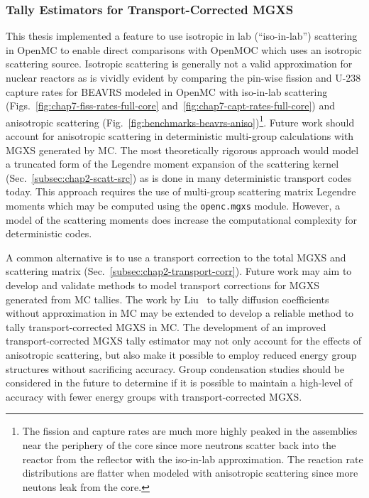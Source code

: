 \subsubsection{Tally Estimators for Transport-Corrected MGXS}
\label{subsubsec:chap12-transport-mgxs}

This thesis implemented a feature to use isotropic in lab (``iso-in-lab'') scattering in OpenMC to enable direct comparisons with OpenMOC which uses an isotropic scattering source. Isotropic scattering is generally not a valid approximation for nuclear reactors as is vividly evident by comparing the pin-wise fission and U-238 capture rates for \ac{BEAVRS} modeled in OpenMC with iso-in-lab scattering (Figs.~\ref{fig:chap7-fiss-rates-full-core} and~\ref{fig:chap7-capt-rates-full-core}) and anisotropic scattering (Fig.~\ref{fig:benchmarks-beavrs-aniso})\footnote{The fission and capture rates are much more highly peaked in the assemblies near the periphery of the core since more neutrons scatter back into the reactor from the reflector with the iso-in-lab approximation. The reaction rate distributions are flatter when modeled with anisotropic scattering since more neutons leak from the core.}. Future work should account for anisotropic scattering in deterministic multi-group calculations with \ac{MGXS} generated by \ac{MC}. The most theoretically rigorous approach would model a truncated form of the Legendre moment expansion of the scattering kernel (Sec.~\ref{subsec:chap2-scatt-src}) as is done in many deterministic transport codes today. This approach requires the use of multi-group scattering matrix Legendre moments which may be computed using the \texttt{openc.mgxs} module. However, a model of the scattering moments does increase the computational complexity for deterministic codes.

A common alternative is to use a transport correction to the total \ac{MGXS} and scattering matrix (Sec.~\ref{subsec:chap2-transport-corr}). Future work may aim to develop and validate methods to model transport corrections for \ac{MGXS} generated from \ac{MC} tallies. The work by Liu~\cite{liuphysor2016} to tally diffusion coefficients without approximation in \ac{MC} may be extended to develop a reliable method to tally transport-corrected \ac{MGXS} in \ac{MC}. The development of an improved transport-corrected \ac{MGXS} tally estimator may not only account for the effects of anisotropic scattering, but also make it possible to employ reduced energy group structures without sacrificing accuracy. Group condensation studies should be considered in the future to determine if it is possible to maintain a high-level of accuracy with fewer energy groups with transport-corrected \ac{MGXS}.

